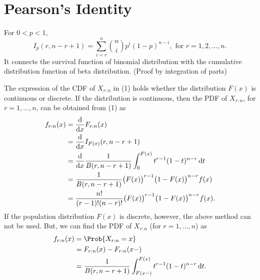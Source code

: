 \section*{Pearson's Identity}
For $ 0<p<1 $,
\[ I_p(r,n-r+1)=\sum_{i=r}^{n}\binom{n}{i}p^i (1-p)^{n-i},\text{ for } r=1,2,\ldots,n. \]
It connects the survival function of binomial distribution
with the cumulative distribution function of beta distribution. (Proof by integration of parts)
\begin{Remark}{}{}
    The expression of the CDF of $ X_{r:n} $ in (1) holds whether the distribution $ F(x) $ is continuous or discrete.
    \tcblower{}
    If the distribution is continuous, then the PDF of $ X_{r:n} $, for $ r=1,\ldots,n $, can be obtained from (1) as
    \begin{align*}
        f_{r:n}(x)
         & =\odv*{F_{r:n}(x)}{x}                                                       \\
         & =\odv*{I_{F(x)}(r,n-r+1)}{x}                                                \\
         & =\odv*{\frac{1}{B(r,n-r+1)}\int_{0}^{F(x)}t^{r-1}(1-t)^{n-r}\odif{t}}{x}    \\
         & =\frac{1}{B(r,n-r+1)}\bigl(F(x)\bigr)^{r-1}\bigl(1-F(x)\bigr)^{n-r}f(x)     \\
         & =\frac{n!}{(r-1)!(n-r)!}\bigl(F(x)\bigr)^{r-1}\bigl(1-F(x)\bigr)^{n-r}f(x).
    \end{align*}
    If the population distribution $ F(x) $ is discrete, however, the above method can not be used. But,
    we can find the PDF of $ X_{r:n} $ (for $ r=1,\ldots,n $) as
    \begin{align*}
        f_{r:n}(x)
         & =\Prob{X_{r:n}=x}                                                   \\
         & =F_{r:n}(x)-F_{r:n}(x-)                                             \\
         & =\frac{1}{B(r,n-r+1)}\int_{F(x-)}^{F(x)}t^{r-1}(1-t)^{n-r}\odif{t}.
    \end{align*}
\end{Remark}
